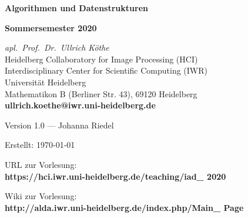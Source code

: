 \documentclass[11pt, fleqn]{scrreprt}
\begin{document}
\thispagestyle{plain}
\begin{titlepage}

    \begin{center}
        {\LARGE\textbf{Algorithmen und Datenstrukturen}} \medskip

        {\LARGE\textbf{Sommersemester 2020}}

        \vspace{3.7cm}

        {\textit{apl.\ Prof.\ Dr.\ Ullrich Köthe}} \\
        {\small Heidelberg Collaboratory for Image Processing (HCI)} \\
        {\small Interdisciplinary Center for Scientific Computing (IWR)} \\
        {\small Universität Heidelberg } \\
        {\small Mathematikon B (Berliner Str. 43), 69120 Heidelberg} \\
        \textbf{ullrich.koethe@iwr.uni-heidelberg.de}

        \vspace{8cm}

        Version 1.0 --- Johanna Riedel

        \bigskip

        Erstellt: \today

        \bigskip

        URL zur Vorlesung:  \\

        \textbf{https://hci.iwr.uni-heidelberg.de/teaching/iad\_ 2020}

        \bigskip

        Wiki zur Vorlesung: \\

        \textbf{http://alda.iwr.uni-heidelberg.de/index.php/Main\_ Page}



    \end{center}
\end{titlepage}
\restoregeometry{}

\tableofcontents

\newpage












\end{document}
